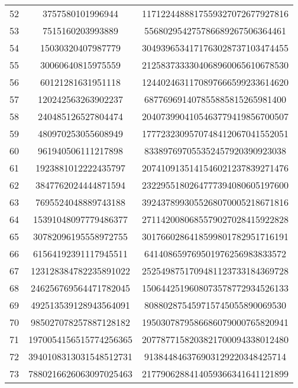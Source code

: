 \documentclass[fleqn]{article}
\begin{document}
\begin{center}
\begin{tabular}{c | c | c}
        \end{tabular}
        \newpage
        \begin{tabular}{c | c | c}
            52 & 3757580101996944 & 1171224488817559327072677927816 \\
            53 & 7515160203993889 & 556802954275786689267506364461 \\
            54 & 15030320407987779 & 3049396534171763028737103474455 \\
            55 & 30060640815975559 & 2125837333304068960065610678530 \\
            56 & 60121281631951118 & 1244024631170897666599233614620 \\
            57 & 120242563263902237 & 687769691407855885815265981400 \\
            58 & 240485126527804474 & 2040739904105463779419856700507 \\
            59 & 480970253055608949 & 1777232309570748412067041552051 \\
            60 & 961940506111217898 & 833897697055352457920390923038 \\
            61 & 1923881012222435797 & 2074109135141546021237839271476 \\
            62 & 3847762024444871594 & 2322955180264777394080605197600 \\
            63 & 7695524048889743188 & 3924378993055268070005218671816 \\
            64 & 15391048097779486377 & 2711420080685579027028415922828 \\
            65 & 30782096195558972755 & 3017660286418599801782951716191 \\
            66 & 61564192391117945511 & 641408659769501976256983833572 \\
            67 & 123128384782235891022 & 2525498751709481123733184369728 \\
            68 & 246256769564471782045 & 1506442519608073578772934526133 \\
            69 & 492513539128943564091 & 808802875459715745055890069530 \\
            70 & 985027078257887128182 & 1950307879586686079000765820941 \\
            71 & 1970054156515774256365 & 2077877158203821700094338012480 \\
            72 & 3940108313031548512731 & 913844846376903129220348425714 \\
            73 & 7880216626063097025463 & 2177906288414059366341641121899 \\

\end{tabular}
\end{center}
\end{document}
